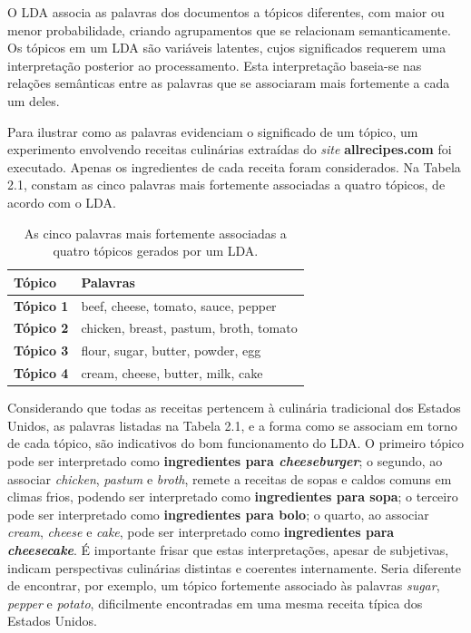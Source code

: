 O LDA associa as palavras dos documentos a tópicos diferentes, com maior ou menor probabilidade, criando agrupamentos que se relacionam semanticamente. Os tópicos em um LDA são variáveis latentes, cujos significados requerem uma interpretação posterior ao processamento. Esta interpretação baseia-se nas relações semânticas entre as palavras que se associaram mais fortemente a cada um deles. %

Para ilustrar como as palavras evidenciam o significado de um tópico, um experimento envolvendo receitas culinárias extraídas do \emph{site} \textbf{allrecipes.com} foi executado. Apenas os ingredientes de cada receita foram considerados. Na Tabela 2.1, constam as cinco palavras mais fortemente associadas a quatro tópicos, de acordo com o LDA. %

\begin{table}[t]
\centering
\label{LDA:1}
\begin{tabular}{| l | p{7cm} | }
\hline
\textbf{Tópico} & \textbf{Palavras} \\ \hline
\textbf{Tópico 1} & beef, cheese, tomato, sauce, pepper \\ \hline
\textbf{Tópico 2} & chicken, breast, pastum, broth, tomato \\ \hline
\textbf{Tópico 3} & flour, sugar, butter, powder, egg  \\ \hline
\textbf{Tópico 4} & cream, cheese, butter, milk, cake \\ \hline
\end{tabular}
\caption{As cinco palavras mais fortemente associadas a quatro tópicos gerados por um LDA.}
\end{table}

Considerando que todas as receitas pertencem à culinária tradicional dos Estados Unidos, as palavras listadas na Tabela 2.1, e a forma como se associam em torno de cada tópico, são indicativos do bom funcionamento do LDA. O primeiro tópico pode ser interpretado como \textbf{ingredientes para          \emph{cheeseburger}}; o segundo, ao associar \emph{chicken}, \emph{pastum} e \emph{broth}, remete a receitas de sopas e caldos comuns em climas frios, podendo ser interpretado como \textbf{ingredientes para sopa}; o terceiro pode ser interpretado como \textbf{ingredientes para bolo}; o quarto, ao associar \emph{cream}, \emph{cheese} e \emph{cake}, pode ser interpretado como \textbf{ingredientes para \emph{cheesecake}}. É importante frisar que estas interpretações, apesar de subjetivas, indicam perspectivas culinárias distintas e coerentes internamente. Seria diferente de encontrar, por exemplo, um tópico fortemente associado às palavras \emph{sugar}, \emph{pepper} e \emph{potato}, dificilmente encontradas em uma mesma receita típica dos Estados Unidos.


